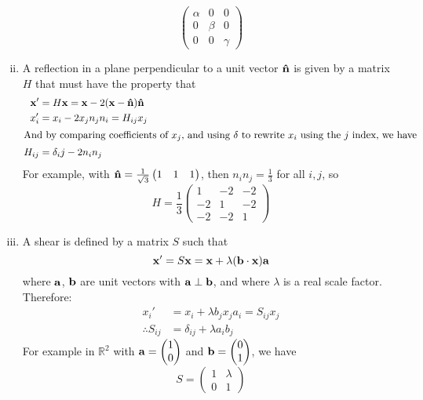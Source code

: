 \begin{enumerate}[(i)]
	      \[ \begin{pmatrix}
			      \alpha & 0     & 0      \\
			      0      & \beta & 0      \\
			      0      & 0     & \gamma
		      \end{pmatrix} \]
	\item A reflection in a plane perpendicular to a unit vector $\vu n$ is given by a matrix $H$ that must have the property that
	      \begin{align*}
		      \vb x' & = H \vb x = \vb x - 2(\vb x - \vu n) \vu n \\
		      x_i'   & = x_i - 2x_jn_jn_i = H_{ij}x_j             \\
		      \intertext{And by comparing coefficients of $x_j$, and using $\delta$ to rewrite $x_i$ using the $j$ index, we have}
		      H_{ij} & = \delta_ij - 2n_in_j
	      \end{align*}
	      For example, with $\vu n = \frac{1}{\sqrt 3}\begin{pmatrix}
			      1 & 1 & 1
		      \end{pmatrix}$, then $n_in_j = \frac{1}{3}$ for all $i, j$, so
	      \[ H = \frac{1}{3}\begin{pmatrix}
			      1  & -2 & -2 \\
			      -2 & 1  & -2 \\
			      -2 & -2 & 1
		      \end{pmatrix} \]
	\item A shear is defined by a matrix $S$ such that
	      \[ \vb x' = S\vb x = \vb x + \lambda(\vb b \cdot \vb x)\vb a \]
	      where $\vb a$, $\vb b$ are unit vectors with $\vb a \perp \vb b$, and where $\lambda$ is a real scale factor. Therefore:
	      \begin{align*}
		      x_i'              & = x_i + \lambda b_j x_j a_i = S_{ij}x_j \\
		      \therefore S_{ij} & = \delta_{ij} + \lambda a_i b_j
	      \end{align*}
	      For example in $\mathbb R^2$ with $\vb a = \begin{pmatrix}
			      1 \\ 0
		      \end{pmatrix}$ and $\vb b = \begin{pmatrix}
			      0 \\ 1
		      \end{pmatrix}$, we have
	      \[ S = \begin{pmatrix}
			      1 & \lambda \\ 0 & 1

\end{pmatrix}\]
\end{enumerate}
